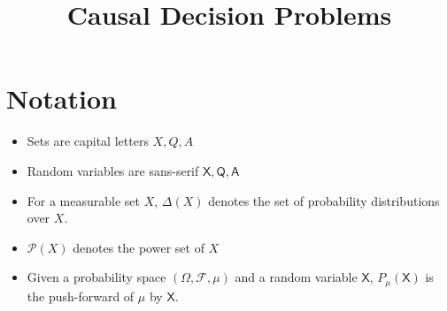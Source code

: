 \documentclass{article}
\title{Causal Decision Problems}
\theoremstyle{definition}
\theoremstyle{remark}
\newcommand{\RV}[1]{\ensuremath{\mathsf{#1}}}
\begin{document}
\maketitle

\tableofcontents
\newpage

\section{Notation}

\begin{itemize}
    \item Sets are capital letters $X,Q,A$
    \item Random variables are sans-serif $\RV{X,Q,A}$
    \item For a measurable set $X$, $\Delta(X)$ denotes the set of probability distributions over $X$.
    \item $\mathscr{P}(X)$ denotes the power set of $X$
    \item Given a probability space $(\Omega,\mathcal{F},\mu)$ and a random variable $\RV{X}$, $P_\mu(\RV{X})$ is the push-forward of $\mu$ by $\RV{X}$.
\end{itemize}









\end{document}
